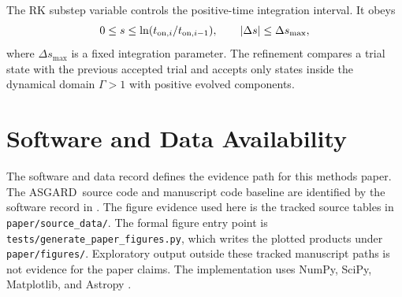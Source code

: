 \documentclass[twocolumn]{aastex702}
\newcommand{\asgard}{\textsc{ASGARD}}
\begin{document}
The RK substep variable controls the positive-time integration interval.  It
obeys
\begin{equation}
0\le s\le \ln(t_{{\rm on},i}/t_{{\rm on},i-1}),
\qquad
|\Delta s|\le\Delta s_{\max},
\end{equation}
where \(\Delta s_{\max}\) is a fixed integration parameter.  The refinement
compares a trial state with the previous accepted trial and accepts only states
inside the dynamical domain \(\Gamma>1\) with positive evolved components.

\section{Software and Data Availability} \label{app:data}

The software and data record defines the evidence path for this methods paper.
The \asgard\ source code and manuscript code baseline are identified by the
software record in \citet{ASGARDSoftware}.  The figure evidence used here is the
tracked source tables in \texttt{paper/source\_data/}.  The formal figure entry
point is \texttt{tests/generate\_paper\_figures.py}, which writes the plotted
products under \texttt{paper/figures/}.  Exploratory output outside these tracked
manuscript paths is not evidence for the paper claims.  The implementation uses
NumPy, SciPy, Matplotlib, and Astropy
\citep{Harris2020,Virtanen2020,Hunter2007,Astropy2022}.

\clearpage



\end{document}
